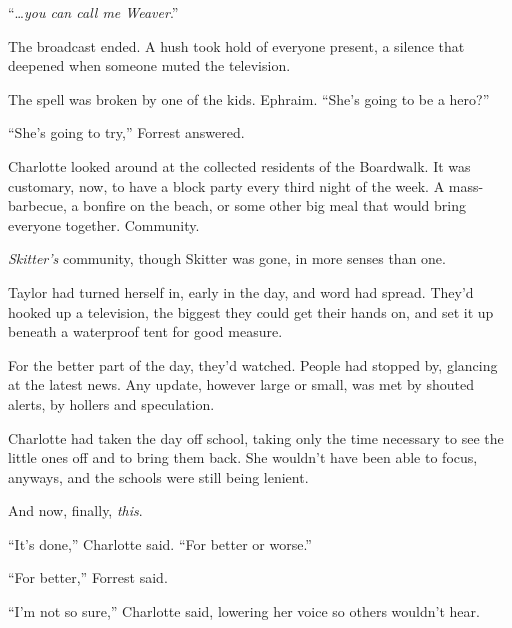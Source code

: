 





``\ldots\emph{you can call me Weaver}.''



The broadcast ended.   A hush took hold of everyone present, a silence that deepened when someone muted the television.



The spell was broken by one of the kids.  Ephraim.  ``She's going to be a hero?''



``She's going to try,'' Forrest answered.



Charlotte looked around at the collected residents of the Boardwalk.  It was customary, now, to have a block party every third night of the week.  A mass-barbecue, a bonfire on the beach, or some other big meal that would bring everyone together.  Community.



\emph{Skitter's} community, though Skitter was gone, in more senses than one.



Taylor had turned herself in, early in the day, and word had spread.  They'd hooked up a television, the biggest they could get their hands on, and set it up beneath a waterproof tent for good measure.



For the better part of the day, they'd watched.  People had stopped by, glancing at the latest news.  Any update, however large or small, was met by shouted alerts, by hollers and speculation.



Charlotte had taken the day off school, taking only the time necessary to see the little ones off and to bring them back.  She wouldn't have been able to focus, anyways, and the schools were still being lenient.



And now, finally, \emph{this}.



``It's done,'' Charlotte said.  ``For better or worse.''



``For better,'' Forrest said.



``I'm not so sure,'' Charlotte said, lowering her voice so others wouldn't hear.



